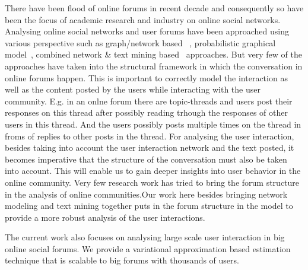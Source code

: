There have been flood of online forums in recent decade and consequently so have
been the focus of academic research and industry on online social networks. 
Analysing online social networks and user forums have been approached using
various perspective such as graph/network based~\cite{Shi:2000:NCI:351581.351611,
Shi00learningsegmentation} , probabilistic graphical model~\cite{ Airoldi:2008:MMS:1390681.1442798}, 
combined network \& text mining
based~\cite{Ho:2012:DHT:2187836.2187936,Nallapati:2008:JLT:1401890.1401957} approaches.
But very few of the approaches have taken into the structural framework in which the
conversation in online forums happen. This is important to correctly model the
interaction as well as the content posted by the users while interacting with
the user community. E.g. in an onlne forum there are topic-threads and users
post their responses on this thread after possibly reading trhough the responses
of other users in this thread. And the users possibly posts multiple times on
the thread in froms of replies to other posts in the thread. For analysing
the user interaction, besides taking into account the user interaction network
and the text posted, it becomes imperative that the structure of the
conversation must also be taken into account. This will enable us to gain
deeper insights into user behavior in the online community. Very few research
work has tried to bring the forum structure in the analysis of online
communities.Our work here besides bringing network modeling and text mining together 
puts in the forum structure in the model to provide a more robust analysis of
the user interactions. 

The current work also focuses on analysing large scale user interaction in big
online social forums. We provide a variational approximation based estimation
technique that is scalable to big forums with thousands of users.
~


